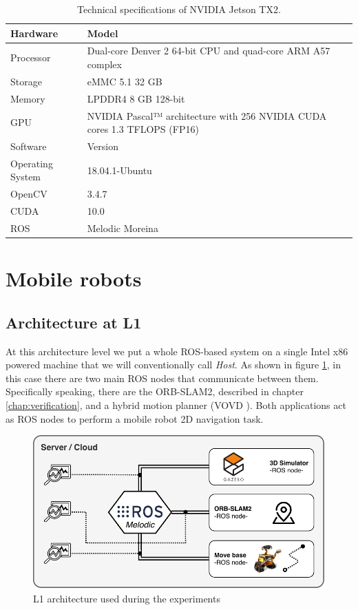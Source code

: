 \begin{table}[htbp]
	\centering
	\begin{tabularx}{\linewidth}{|l|X|}
		\hline
		\rowcolor{Gray}
		Hardware         & Model \\
		\hline
		Processor        & Dual-core Denver 2 64-bit CPU and quad-core ARM A57 complex \\
		Storage          & eMMC 5.1 32 GB \\
		Memory           & LPDDR4 8 GB 128-bit \\
		GPU              & NVIDIA Pascal™ architecture with 256 NVIDIA CUDA cores 1.3 TFLOPS (FP16) \\
		\hline
		\rowcolor{Gray}
		Software         & Version \\
		\hline
		Operating System & 18.04.1-Ubuntu \\
		OpenCV           & 3.4.7 \\
		CUDA             & 10.0  \\
		ROS              & Melodic Moreina \\
		\hline
	\end{tabularx}
	\caption{Technical specifications of NVIDIA Jetson TX2. \label{tab:tech-specs-tx2}}
\end{table}


\section{Mobile robots}





\subsection{Architecture at L1}
At this architecture level we put a whole ROS-based system on a single Intel x86 powered machine that we will conventionally call \textit{Host}.
As shown in figure \ref{fig:l1archexp}, in this case there are two main ROS nodes that communicate between them. Specifically speaking, there are the ORB-SLAM2, described in chapter \ref{chap:verification}, and a hybrid motion planner (VOVD \cite{VOVD}). Both applications act as ROS nodes to perform a mobile robot 2D navigation task.

\begin{figure}[htbp]
	\centering
	\includegraphics[width=\textwidth]{images/L1-arch-exp}
	\caption{L1 architecture used during the experiments}
	\label{fig:l1archexp}
\end{figure}

